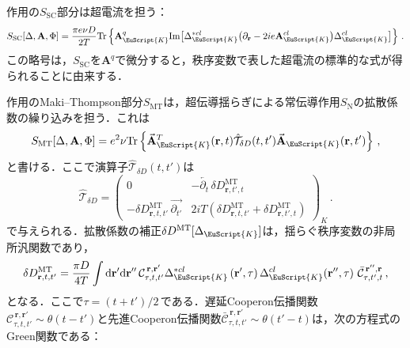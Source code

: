 \documentclass[a4paper,11pt]{ltjsarticle}
\def\Tr{\mathrm{Tr}}
\def\rt{(\mathbf{r},t)}
\def\rtp{(\mathbf{r},t')}
\begin{document}
作用の$S_{\mathrm{SC}}$部分は超電流を担う：
\begin{equation}\label{SuperCond-S-SC}
S_{\mathrm{SC}}[\Delta,\mathbf{A},\Phi]=\frac{\pi e\nu
D}{2T}\Tr\left\{\mathbf{A}^{q}_{\EuScript{K}}\mathrm{Im}
\big[\Delta^{*cl}_{\EuScript{K}}
\big(\partial_{\mathbf{r}}-2ie\mathbf{A}^{cl}_{\EuScript{K}}\big)
\Delta^{cl}_{\EuScript{K}}\big]\right\}\,.
\end{equation}
この略号は，$S_{\mathrm{SC}}$を$\mathbf{A}^{q}$で微分すると，秩序変数で表した超電流の標準的な式\cite{Tinkham}が得られることに由来する．


作用のMaki--Thompson部分$S_{\mathrm{MT}}$は，超伝導揺らぎによる常伝導作用$S_\mathrm{N}$の拡散係数の繰り込みを担う．これは
\begin{equation}\label{SuperCond-S-MT}
S_{\mathrm{MT}}[\Delta,\mathbf{A},\Phi]=
e^{2}\nu\Tr\left\{\vec{\mathbf{A}}^{T}_{\EuScript{K}}\rt\hat{\mathcal{T}}_{\delta
D}(t,t')\vec{\mathbf{A}}_{\EuScript{K}}\rtp\right\}\,,
\end{equation}
と書ける．ここで演算子$\hat{\mathcal{T}}_{\delta D}(t,t')$は
\begin{equation}
\hat{\mathcal{T}}_{\delta D}=\left(\begin{array}{cc} 0 &
-\overleftarrow{\partial_{t}}\,
\delta D^{\mathrm{MT}}_{\mathbf{r},t',t} \\
-\delta D^{\mathrm{MT}}_{\mathbf{r},t,t'}\,
\overrightarrow{\partial_{t'}} & 2iT \left( \delta
D^{\mathrm{MT}}_{\mathbf{r},t,t'} + \delta
D^{\mathrm{MT}}_{\mathbf{r},t',t} \right)
\end{array}\right)_K\,.
\end{equation}
で与えられる．拡散係数の補正$\delta D^{\mathrm{MT}}[\Delta_{\EuScript{K}}]$は，揺らぐ秩序変数の非局所汎関数であり，
\begin{equation} \label{SuperCond-D-MT}
\delta D^{\mathrm{MT}}_{\mathbf{r},t,t'}=\frac{\pi
D}{4T}\int\mathrm{d} \mathbf{r}'\mathrm{d}\mathbf{r}''\,
 \mathcal{C}^{\,\mathbf{r},\mathbf{r}'}_{\tau,t,t'}
 {\Delta}^{*cl}_\EuScript{K}\left(\mathbf{r}',\tau\right)
 {\Delta}^{cl}_\EuScript{K}(\mathbf{r}'',\tau)\
\bar{\mathcal{C}}^{\,\mathbf{r}'',\mathbf{r}}_{\tau,t',t}\,,
\end{equation}
となる．ここで$\tau=(t+ t')/2\,$である．遅延Cooperon伝播関数$\mathcal{C}^{\,\mathbf{r},\mathbf{r}'}_{\tau,t,t'}\sim\theta(t-t')$と先進Cooperon伝播関数$\bar{\mathcal{C}}^{\,\mathbf{r},\mathbf{r}'}_{\tau,t,t'}\sim\theta(t'-t)$は，次の方程式のGreen関数である：
\end{document}
